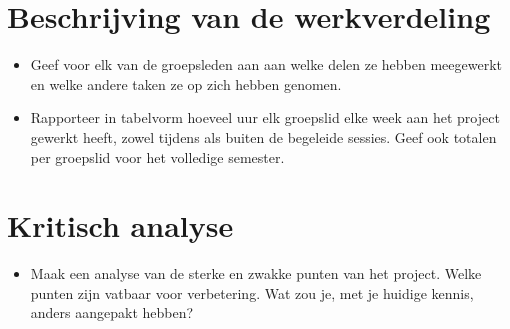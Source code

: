 \documentclass[tt1]{penoverslag}
\begin{document}
\section{Beschrijving van de werkverdeling}
\begin{itemize}
\item Geef voor elk van de groepsleden aan aan welke delen ze hebben meegewerkt en welke andere taken ze op zich hebben genomen.
\item Rapporteer in tabelvorm hoeveel uur elk groepslid elke week aan het project gewerkt heeft, zowel tijdens als buiten de begeleide sessies. Geef ook totalen per groepslid voor het volledige semester.
\end{itemize}


\section{Kritisch analyse}
\begin{itemize}
\item Maak een analyse van de sterke en zwakke punten van het project. Welke punten zijn vatbaar voor verbetering. Wat zou je, met je huidige kennis, anders aangepakt hebben?
\end{itemize}



\newpage


\end{document}
